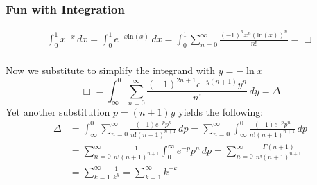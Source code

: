 \documentclass[11pt, xcolor=dvipsnames]{beamer}
\begin{document}
\color{white}
\begin{frame}
\frametitle{Fun with Integration}
\begin{eqnarray}
\boxed{\int_0^1 x^{-x} \,dx} = \int_0^1 e^{-x\text{ln}(x)} \,dx = \int_0^1 \sum_{n=0}^{\infty} \frac{(-1)^n x^n (\text{ln}(x))^n}{n!}  =\Box\\
\end{eqnarray}

Now we substitute to simplify the integrand with \(y=-\ln{x}\)
\begin{equation*}
\Box =\int_{\infty}^0 \sum_{n=0}^{\infty} \frac{(-1)^{2n+1} e^{-y(n+1)} y^n}{n!} \, dy= \Delta
\end{equation*}
Yet another substitution \( p=(n+1)y\) yields the following:\\
\begin{equation*}
\begin{split}
\Delta &= \int_{\infty}^0 \sum_{n=0}^{\infty} \frac{(-1) e^{-p} p^n}{n! (n+1)^{n+1}} \, dp =  \sum_{n=0}^{\infty} \int_{\infty}^0 \frac{(-1) e^{-p} p^n}{n! (n+1)^{n+1}} \, dp  \\
&=\sum_{n=0}^{\infty} \frac{1}{n! (n+1)^{n+1}}\int^{\infty}_0  e^{-p} p^n \, dp = \sum_{n=0}^{\infty} \frac{\Gamma (n+1)}{n! (n+1)^{n+1}} \\
&=\sum_{k=1}^{\infty} \frac{1}{k^k} =
\boxed{\sum_{k=1}^{\infty} k^{-k}}
\end{split}
\end{equation*}
\end{frame}
\end{document}
